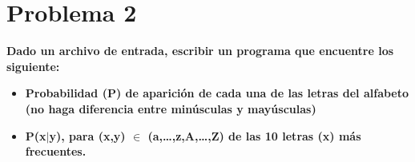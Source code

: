 \section*{Problema 2}

\textbf{Dado un archivo de entrada, escribir un programa que encuentre los siguiente:}

\begin{itemize}
    \item  \textbf{Probabilidad (P) de aparición de cada una de las letras del alfabeto (no haga diferencia entre minúsculas y mayúsculas)}
    \item \textbf{P(x$|$y), para (x,y) $\mathbb{\in}$ (a,…,z,A,…,Z) de las 10 letras (x) más frecuentes.}
\end{itemize}
